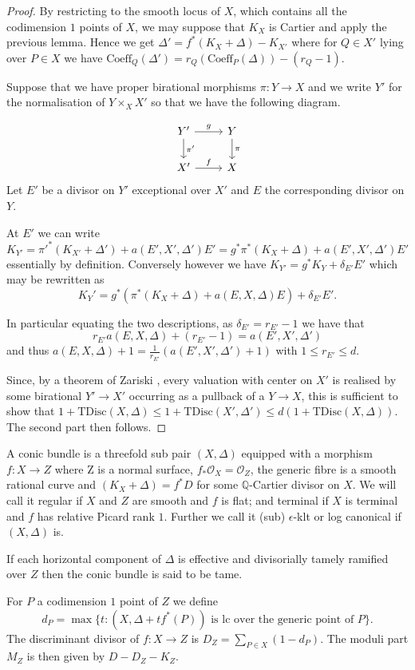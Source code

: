 \documentclass[a4paper,12pt]{book}
\newcommand{\ox}{\mathcal{O}_{X}}
\begin{document}
\begin{proof}
	
	By restricting to the smooth locus of $X$, which contains all the codimension $1$ points of $X$, we may suppose that $K_{X}$ is Cartier and apply the previous lemma. Hence we get $\Delta'=f^{*}(K_{X}+\Delta)-K_{X'}$ where for $Q\in X'$ lying over $P\in X$ we have $\text{Coeff}_{Q}(\Delta')=r_{Q}(\text{Coeff}_{P}(\Delta))-(r_{Q}-1)$.
	
	Suppose that we have proper birational morphisms $\pi\colon Y \to X$ and we write $Y'$ for the normalisation of $Y\times_{X} X'$ so that we have the following diagram.
	
	\[\begin{tikzcd}
	Y' \arrow[d, "\pi'"] \arrow[r, "g"] & Y \arrow[d, "\pi"] \\
	X' \arrow[r, "f"]                   & X                 
	\end{tikzcd}\]
	Let $E'$ be a divisor on $Y'$ exceptional over $X'$ and $E$ the corresponding divisor on $Y$.
	
	At $E'$ we can write $$K_{Y'}= \pi'^{*}(K_{X'}+\Delta')+a(E',X',\Delta')E'=g^{*}\pi^{*}(K_{X}+\Delta)+a(E',X',\Delta')E'$$
	essentially by definition. Conversely however we have $K_{Y'}=g^{*}K_{Y}+\delta_{E'}E'$ which may be rewritten as 
	$$K_{Y}'=g^{*}(\pi^{*}(K_{X}+\Delta)+a(E,X,\Delta)E)+\delta_{E'}E'.$$
	
	In particular equating the two descriptions, as $\delta_{E'}=r_{E'}-1$ we have that
	\[r_{E'}a(E,X,\Delta)+(r_{E'}-1)=a(E',X',\Delta')\]
	and thus $a(E,X,\Delta)+1=\frac{1}{r_{E'}}(a(E',X',\Delta')+1)$ with $1 \leq r_{E'} \leq d$.
	
	Since, by a theorem of Zariski \cite[Theorem VI.1.3]{k-rat-curves}, every valuation with center on $X'$ is realised by some birational $Y' \to X'$ occurring as a pullback of a $Y \to X$, this is sufficient to show that $1+\text{TDisc}(X,\Delta) \leq 1+\text{TDisc}(X',\Delta') \leq d(1+\text{TDisc}(X,\Delta))$. The second part then follows.
\end{proof}


\begin{definition}
	A conic bundle is a threefold sub pair $(X,\Delta)$ equipped with a morphism $f\colon X \to Z$ where Z is a normal surface, $f_{*}\ox=\mathcal{O}_{Z}$, the generic fibre is a smooth rational curve and $(K_{X}+\Delta)=f^{*}D$ for some $\mathbb{Q}$-Cartier divisor on $X$. We will call it regular if $X$ and $Z$ are smooth and $f$ is flat; and terminal if $X$ is terminal and $f$ has relative Picard rank $1$. Further we call it (sub) $\epsilon$-klt or log canonical if $(X,\Delta)$ is.
	
	If each horizontal component of $\Delta$ is effective and divisorially tamely ramified over $Z$ then the conic bundle is said to be tame.
	
	For $P$ a codimension $1$ point of $Z$ we define $$d_{P}=\max\{t\colon  (X,\Delta+tf^{*}(P)) \text{ is lc over the generic point of } P\}.$$
	The discriminant divisor of $f\colon X \to Z$ is $D_{Z}=\sum_{P \in X}(1-d_{P})$.
	The moduli part $M_{Z}$ is then given by $D-D_{Z}-K_{Z}$.
\end{definition}
\end{document}
